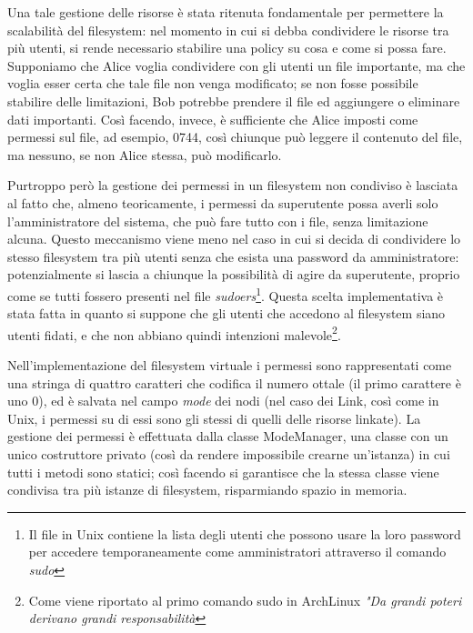  Una tale gestione delle risorse è stata ritenuta fondamentale per permettere la scalabilità del filesystem: nel momento in cui si debba condividere le risorse tra più utenti, si rende necessario stabilire una policy su cosa e come si possa fare. Supponiamo che Alice voglia condividere con gli utenti un file importante, ma che voglia esser certa che tale file non venga modificato; se non fosse possibile stabilire delle limitazioni, Bob potrebbe prendere il file ed aggiungere o eliminare dati importanti. Così facendo, invece, è sufficiente che Alice imposti come permessi sul file, ad esempio, 0744, così chiunque può leggere il contenuto del file, ma nessuno, se non Alice stessa, può modificarlo.
 
 Purtroppo però la gestione dei permessi in un filesystem non condiviso è lasciata al fatto che, almeno teoricamente, i permessi da superutente possa averli solo l'amministratore del sistema, che può fare tutto con i file, senza limitazione alcuna. Questo meccanismo viene meno nel caso in cui si decida di condividere lo stesso filesystem tra più utenti senza che esista una password da amministratore: potenzialmente si lascia a chiunque la possibilità di agire da superutente, proprio come se tutti fossero presenti nel file \emph{sudoers}\footnote{Il file in Unix contiene la lista degli utenti che possono usare la loro password per accedere temporaneamente come amministratori attraverso il comando \emph{sudo}}. Questa scelta implementativa è stata fatta in quanto si suppone che gli utenti che accedono al filesystem siano utenti fidati, e che non abbiano quindi intenzioni malevole\footnote{Come viene riportato al primo comando sudo in ArchLinux \emph{"Da grandi poteri derivano grandi responsabilità}}.
 
 Nell'implementazione del filesystem virtuale i permessi sono rappresentati come una stringa di quattro caratteri che codifica il numero ottale (il primo carattere è uno 0), ed è salvata nel campo \emph{mode} dei nodi (nel caso dei Link, così come in Unix, i permessi su di essi sono gli stessi di quelli delle risorse linkate). La gestione dei permessi è effettuata dalla classe ModeManager, una classe con un unico costruttore privato (così da rendere impossibile crearne un'istanza) in cui tutti i metodi sono statici; così facendo si garantisce che la stessa classe viene condivisa tra più istanze di filesystem, risparmiando spazio in memoria.
 
